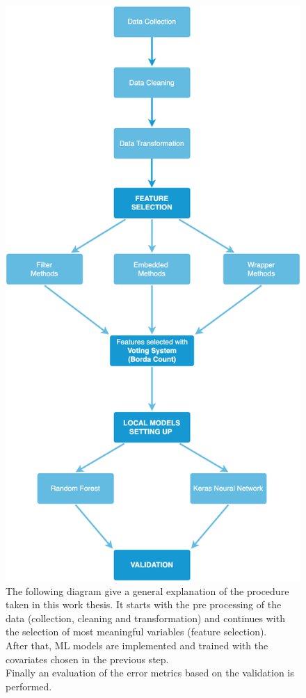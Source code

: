 \begin{figure}[H]
    \centering
    \includegraphics[scale=0.21]{images/overview.png}
    \caption{The following diagram give a general explanation of the procedure taken in this work thesis. It starts with the pre processing of the data (collection, cleaning and transformation) and continues with the selection of most meaningful variables (feature selection). \\
    After that, ML models are implemented and trained with the covariates chosen in the previous step. \\
    Finally an evaluation of the error metrics based on the validation is performed.}
    \label{fig:overview}
\end{figure}


